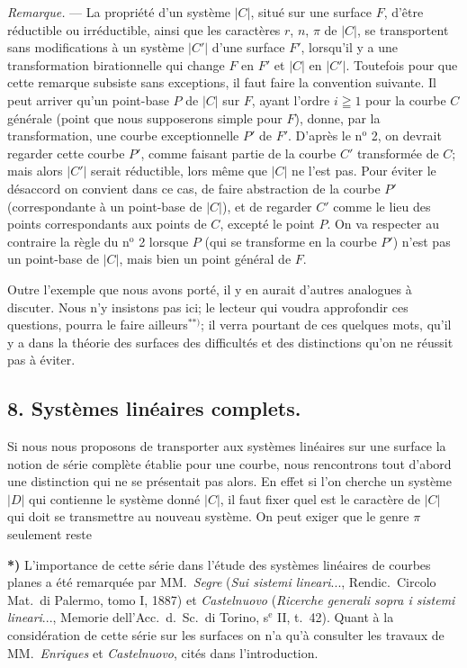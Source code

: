\documentclass{article}
\begin{document}
\emph{Remarque.} --- La propriété d'un système $|C|$, situé sur une surface $F$, d'être réductible ou irréductible, ainsi que les caractères $r$, $n$, $\pi$ de $|C|$, se transportent sans modifications à un système $|C'|$ d'une surface $F'$, lorsqu'il y a une transformation birationnelle qui change $F$ en $F'$ et $|C|$ en $|C'|$. Toutefois pour que cette remarque subsiste sans exceptions, il faut faire la convention suivante. Il peut arriver qu'un point-base $P$ de $|C|$ sur $F$, ayant l'ordre $i \geqq 1$ pour la courbe $C$ générale (point que nous supposerons simple pour $F$), donne, par la transformation, une courbe exceptionnelle $P'$ de $F'$. D'après le n${}^{\text{o}}$ 2, on devrait regarder cette courbe $P'$, comme faisant partie de la courbe $C'$ transformée de $C$; mais alors $|C'|$ serait réductible, lors même que $|C|$ ne l'est pas. Pour éviter le désaccord on convient dans ce cas, de faire abstraction de la courbe $P'$ (correspondante à un point-base de $|C|$), et de regarder $C'$ comme le lieu des points correspondants aux points de $C$, excepté le point $P$. On va respecter au contraire la règle du n${}^{\text{o}}$ 2 lorsque $P$ (qui se transforme en la courbe $P'$) n'est pas un point-base de $|C|$, mais bien un point général de $F$.

Outre l'exemple que nous avons porté, il y en aurait d'autres analogues à discuter. Nous n'y insistons pas ici; le lecteur qui voudra approfondir ces questions, pourra le faire ailleurs${}^{**)}$; il verra pourtant de ces quelques mots, qu'il y a dans la théorie des surfaces des difficultés et des distinctions qu'on ne réussit pas à éviter.

\subsection*{8. Systèmes linéaires complets.}

Si nous nous proposons de transporter aux systèmes linéaires sur une surface la notion de série complète établie pour une courbe, nous rencontrons tout d'abord une distinction qui ne se présentait pas alors. En effet si l'on cherche un système $|D|$ qui contienne le système donné $|C|$, il faut fixer quel est le caractère de $|C|$ qui doit se transmettre au nouveau système. On peut exiger que le genre $\pi$ seulement reste

\textbf{*)} L'importance de cette série dans l'étude des systèmes linéaires de courbes planes a été remarquée par MM.\ \emph{Segre} (\emph{Sui sistemi lineari}..., Rendic.\ Circolo Mat.\ di Palermo, tomo I, 1887) et \emph{Castelnuovo} (\emph{Ricerche generali sopra i sistemi lineari}..., Memorie dell'Acc.\ d.\ Sc.\ di Torino, s${}^{\text{e}}$ II, t.\ 42). Quant à la considération de cette série sur les surfaces on n'a qu'à consulter les travaux de MM.\ \emph{Enriques} et \emph{Castelnuovo}, cités dans l'introduction.
\end{document}
